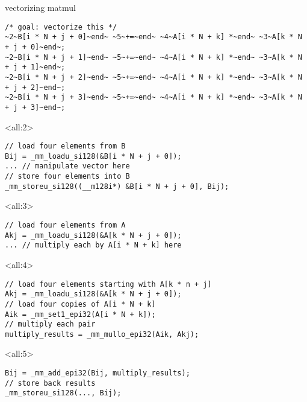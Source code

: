 \begin{frame}[fragile,label=sqSerialUnrolledExpand]{vectorizing matmul}
\begin{lstlisting}
/* goal: vectorize this */
~2~B[i * N + j + 0]~end~ ~5~+=~end~ ~4~A[i * N + k] *~end~ ~3~A[k * N + j + 0]~end~;
~2~B[i * N + j + 1]~end~ ~5~+=~end~ ~4~A[i * N + k] *~end~ ~3~A[k * N + j + 1]~end~;
~2~B[i * N + j + 2]~end~ ~5~+=~end~ ~4~A[i * N + k] *~end~ ~3~A[k * N + j + 2]~end~;
~2~B[i * N + j + 3]~end~ ~5~+=~end~ ~4~A[i * N + k] *~end~ ~3~A[k * N + j + 3]~end~;
\end{lstlisting}
\hrulefill
\begin{onlyenv}<all:2>
\begin{lstlisting}
// load four elements from B
Bij = _mm_loadu_si128(&B[i * N + j + 0]);
... // manipulate vector here
// store four elements into B
_mm_storeu_si128((__m128i*) &B[i * N + j + 0], Bij);
\end{lstlisting}
\end{onlyenv}
\begin{onlyenv}<all:3>
\begin{lstlisting}
// load four elements from A
Akj = _mm_loadu_si128(&A[k * N + j + 0]);
... // multiply each by A[i * N + k] here
\end{lstlisting}
\end{onlyenv}
\begin{onlyenv}<all:4>
\begin{lstlisting}
// load four elements starting with A[k * n + j]
Akj = _mm_loadu_si128(&A[k * N + j + 0]);
// load four copies of A[i * N + k]
Aik = _mm_set1_epi32(A[i * N + k]);
// multiply each pair
multiply_results = _mm_mullo_epi32(Aik, Akj);
\end{lstlisting}
\end{onlyenv}
\begin{onlyenv}<all:5>
\begin{lstlisting}
Bij = _mm_add_epi32(Bij, multiply_results);
// store back results
_mm_storeu_si128(..., Bij);
\end{lstlisting}
\end{onlyenv}
\end{frame}



